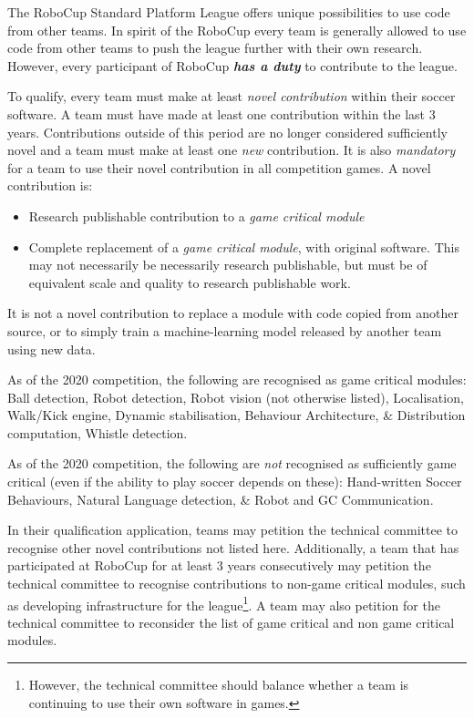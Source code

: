 \documentclass[12pt]{article}
\newcommand{\NovelContributionTime}{3 years\xspace}
\begin{document}
The RoboCup Standard Platform League offers unique possibilities to use code from other teams. In spirit of the RoboCup every team is generally allowed to use code from other teams to push the league further with their own research.
However, every participant of RoboCup \textbf{\textit{has a duty}} to contribute to the league.

To qualify, every team must make at least \textit{novel contribution} within their soccer software.
A team must have made at least one contribution within the last \NovelContributionTime.
Contributions outside of this period are no longer considered sufficiently novel and a team must make at least one \textit{new} contribution.
It is also \textit{mandatory} for a team to use their novel contribution in all competition games.
A novel contribution is:
\begin{itemize}
  \item Research publishable contribution to a \textit{game critical module}
  \item Complete replacement of a \textit{game critical module}, with original software. This may not necessarily be necessarily research publishable, but must be of equivalent scale and quality to research publishable work.
\end{itemize}

It is not a novel contribution to replace a module with code copied from another source, or to simply train a machine-learning model released by another team using new data.

As of the 2020 competition, the following are recognised as game critical modules:
Ball detection, Robot detection, Robot vision (not otherwise listed), Localisation, Walk/Kick engine, Dynamic stabilisation, Behaviour Architecture, \& Distribution computation, Whistle detection.

As of the 2020 competition, the following are \textit{not} recognised as sufficiently game critical (even if the ability to play soccer depends on these):
Hand-written Soccer Behaviours, Natural Language detection, \& Robot and GC Communication.

In their qualification application, teams may petition the technical committee to recognise other novel contributions not listed here.
Additionally, a team that has participated at RoboCup for at least \NovelContributionTime consecutively may petition the technical committee to recognise contributions to non-game critical modules, such as developing infrastructure for the league\footnote{However, the technical committee should balance whether a team is continuing to use their own software in games.}.
A team may also petition for the technical committee to reconsider the list of game critical and non game critical modules.
\end{document}
